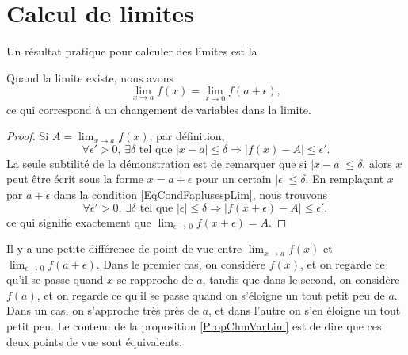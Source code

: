 \section{Calcul de limites}

Un résultat pratique pour calculer des limites est la
\begin{proposition}     \label{PropChmVarLim}
Quand la limite existe, nous avons
\[ 
  \lim_{x\to a}f(x)=\lim_{\epsilon\to 0}f(a+\epsilon),
\]
ce qui correspond à un \og changement de variables\fg{} dans la limite.
\end{proposition}

\begin{proof}
Si $A=\lim_{x\to a}f(x)$, par définition,
\begin{equation}        \label{EqCondFaplusespLim}
\forall\epsilon'>0,\,\exists\delta\text{ tel que }| x-a |\leq\delta\Rightarrow| f(x)-A |\leq\epsilon'.
\end{equation}
La seule subtilité de la démonstration est de remarquer que si $| x-a |\leq\delta$, alors $x$ peut être écrit sous la forme $x=a+\epsilon$ pour un certain $| \epsilon |\leq\delta$. En remplaçant $x$ par $a+\epsilon$ dans la condition \ref{EqCondFaplusespLim}, nous trouvons 
\begin{equation}
\forall\epsilon'>0,\,\exists\delta\text{ tel que }| \epsilon |\leq\delta\Rightarrow| f(x+\epsilon)-A |\leq\epsilon',
\end{equation}
ce qui signifie exactement que $\lim_{\epsilon\to 0}f(x+\epsilon)=A$.   
\end{proof}

Il y a une petite différence de point de vue entre $\lim_{x\to a}f(x)$ et $\lim_{\epsilon\to 0}f(a+\epsilon)$. Dans le premier cas, on considère $f(x)$, et on regarde ce qu'il se passe quand $x$ se rapproche de $a$, tandis que dans le second, on considère $f(a)$, et on regarde ce qu'il se passe quand on s'éloigne un tout petit peu de $a$. Dans un cas, on s'approche très près de $a$, et dans l'autre on s'en éloigne un tout petit peu. Le contenu de la proposition \ref{PropChmVarLim} est de dire que ces deux points de vue sont équivalents.


